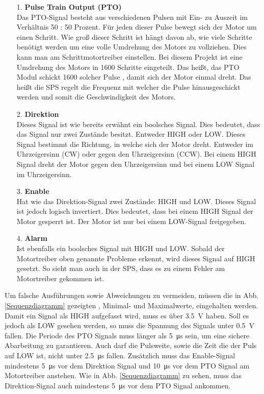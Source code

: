     \begin{itemize}
        \item [1.] \textbf{Pulse Train Output (PTO)} \\
        Das PTO-Signal besteht aus verschiedenen Pulsen mit Ein- zu Auszeit im Verhältnis 50 : 50 Prozent. Für jeden dieser Pulse bewegt sich der Motor um einen Schritt. Wie groß dieser Schritt ist hängt davon ab, wie viele Schritte benötigt werden um eine volle Umdrehung des Motors zu vollziehen. Dies kann man am Schrittmotortreiber einstellen. Bei diesem Projekt ist eine Umdrehung des Motors in 1600 Schritte eingeteilt. Das heißt, das PTO Modul schickt 1600 solcher Pulse , damit sich der Motor einmal dreht. Das heißt die SPS regelt die Frequenz mit welcher die Pulse hinausgeschickt werden und somit die Geschwindigkeit des Motors. 

        \item [2.] \textbf{Direktion} \\
        Dieses Signal ist wie bereits erwähnt ein boolsches Signal. Dies bedeutet, dass das Signal nur zwei Zustände besitzt. Entweder HIGH oder LOW. Dieses Signal bestimmt die Richtung, in welche sich der Motor dreht. Entweder im Uhrzeigersinn (CW) oder gegen den Uhrzeigersinn (CCW). Bei einem HIGH Signal dreht der Motor gegen den Uhrzeigersinn und bei einem LOW Signal im Uhrzeigersinn.

        \item [3.] \textbf{Enable} \\
        Hat wie das Direktion-Signal zwei Zustände: HIGH und LOW. Dieses Signal ist jedoch logisch invertiert. Dies bedeutet, dass bei einem HIGH Signal der Motor gesperrt ist. Der Motor ist nur bei einem LOW-Signal freigegeben. 

        \item [4.] \textbf{Alarm} \\
        Ist ebenfalls ein boolsches Signal mit HIGH und LOW. Sobald der Motortreiber oben genannte Probleme erkennt, wird dieses Signal auf HIGH gesetzt. So sieht man auch in der SPS, dass es zu einem Fehler am Motortreiber gekommen ist. 

    \end{itemize}

Um falsche Ausführungen sowie Abweichungen zu vermeiden, müssen die in Abb. \ref{Sequenzdiagramm} gezeigten , Minimal- und Maximalwerte, eingehalten werden. Damit ein Signal als HIGH aufgefasst wird, muss es über \qty{3.5}{\volt} haben. Soll es jedoch als LOW gesehen werden, so muss die Spannung des Signals unter \qty{0.5}{\volt} fallen. Die Periode des PTO Signals muss länger als \qty{5}{\micro\second} sein, um eine sichere Abarbeitung zu garantieren. Auch darf die Pulsweite, sowie die Zeit die der Puls auf LOW ist, nicht unter \qty{2.5}{\micro\second} fallen. Zusätzlich muss das Enable-Signal mindestens \qty{5}{\micro\second} vor dem Direktion Signal und \qty{10}{\micro\second} vor dem PTO Signal am Motortreiber anstehen. Wie in Abb. \ref{Sequenzdiagramm} zu sehen, muss das Direktion-Signal auch mindestens \qty{5}{\micro\second} vor dem PTO Signal ankommen. 

